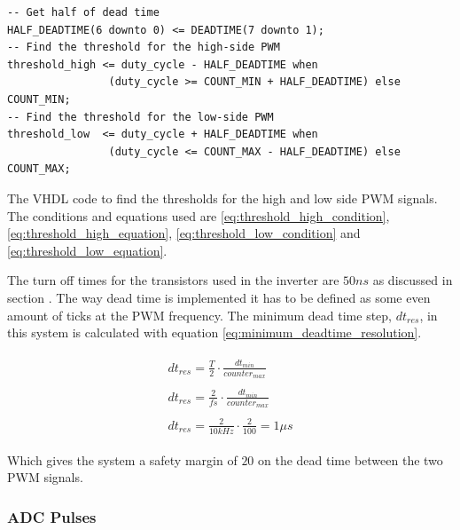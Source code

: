 \begin{verbatim}
-- Get half of dead time
HALF_DEADTIME(6 downto 0) <= DEADTIME(7 downto 1);
-- Find the threshold for the high-side PWM
threshold_high <= duty_cycle - HALF_DEADTIME when 
                (duty_cycle >= COUNT_MIN + HALF_DEADTIME) else COUNT_MIN;
-- Find the threshold for the low-side PWM
threshold_low  <= duty_cycle + HALF_DEADTIME when 
                (duty_cycle <= COUNT_MAX - HALF_DEADTIME) else COUNT_MAX;
\end{verbatim}
\begin{center}
    The VHDL code to find the thresholds for the high and low side PWM signals. The conditions and equations used are \ref{eq:threshold_high_condition}, \ref{eq:threshold_high_equation}, \ref{eq:threshold_low_condition} and \ref{eq:threshold_low_equation}.
\end{center}



The turn off times for the transistors used in the inverter are $50ns$ as discussed in section . 
The way dead time is implemented it has to be defined as some even amount of ticks at the PWM frequency.
The minimum dead time step, $dt_{res}$, in this system is calculated with equation \ref{eq:minimum_deadtime_resolution}.

\begin{subequations}
    \begin{align}
        \begin{split}
            dt_{res} = \frac{T}{2} \cdot \frac{dt_{min}}{counter_{max}}
        \end{split} \\ 
        \begin{split}
             dt_{res} = \frac{2}{fs} \cdot \frac{dt_{min}}{counter_{max}}
        \end{split} \\ 
        \begin{split}
             dt_{res} = \frac{2}{10kHz} \cdot \frac{2}{100} = 1\mu s
        \end{split} 
    \end{align}
    \label{eq:minimum_deadtime_resolution}
\end{subequations}

Which gives the system a safety margin of $20$ on the dead time between the two PWM signals.


\subsubsection*{ADC Pulses}


